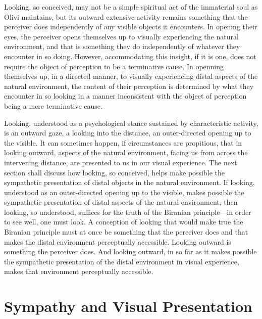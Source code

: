 Looking, so conceived, may not be a simple spiritual act of the immaterial soul as Olivi maintains, but its outward extensive activity remains something that the perceiver does independently of any visible objects it encounters. In opening their eyes, the perceiver opens themselves up to visually experiencing the natural environment, and that is something they do independently of whatever they encounter in so doing. However, accommodating this insight, if it is one, does not require the object of perception to be a terminative cause. In openning themselves up, in a directed manner, to visually experiencing distal aspects of the natural environment, the content of their perception is determined by what they encounter in so looking in a manner inconsistent with the object of perception being a mere terminative cause.

Looking, understood as a psychological stance sustained by characteristic activity, is an outward gaze, a looking into the distance, an outer-directed opening up to the visible. It can sometimes happen, if circumstances are propitious, that in looking outward, aspects of the natural environment, facing us from across the intervening distance, are presented to us in our visual experience. The next section shall discuss how looking, so conceived, helps make possible the sympathetic presentation of distal objects in the natural environment. If looking, understood as an outer-directed opening up to the visible, makes possible the sympathetic presentation of distal aspects of the natural environment, then looking, so understood, suffices for the truth of the Biranian principle---in order to see well, one must look. A conception of looking that would make true the Biranian principle must at once be something that the perceiver does and that makes the distal environment perceptually accessible. Looking outward is something the perceiver does. And looking outward, in so far as it makes possible the sympathetic presentation of the distal environment in visual experience, makes that environment perceptually accessible.


\section{Sympathy and Visual Presentation} %
\label{sec:sympathy_and_visual_presentation}

